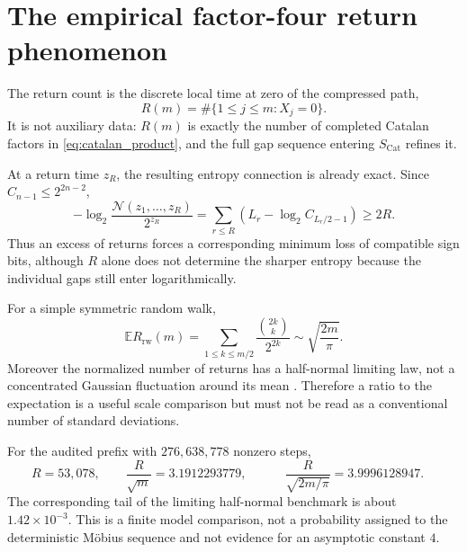 \documentclass[11pt]{amsart}
\numberwithin{equation}{section}
\theoremstyle{plain}
\theoremstyle{definition}
\theoremstyle{remark}
\newcommand{\Cat}{C}
\begin{document}
\section{The empirical factor-four return phenomenon}
\label{sec:factor_four_returns}

The return count is the discrete local time at zero of the compressed path,
\begin{equation}
 R(m)=\#\{1\leq j\leq m:X_j=0\}.
\label{eq:compressed_return_local_time}
\end{equation}
It is not auxiliary data: $R(m)$ is exactly the number of completed Catalan
factors in \eqref{eq:catalan_product}, and the full gap sequence entering
$S_{\mathrm{Cat}}$ refines it.

At a return time $z_R$, the resulting entropy connection is already exact.
Since $\Cat_{n-1}\leq2^{2n-2}$,
\begin{equation}
 -\log_2\frac{\mathcal N(z_1,\ldots,z_R)}{2^{z_R}}
 =\sum_{r\leq R}\left(L_r-\log_2\Cat_{L_r/2-1}\right)
 \geq2R.
\label{eq:return_entropy_lower_bound}
\end{equation}
Thus an excess of returns forces a corresponding minimum loss of compatible
sign bits, although $R$ alone does not determine the sharper entropy because
the individual gaps still enter logarithmically.

For a simple symmetric random walk,
\begin{equation}
 \mathbb E R_{\mathrm{rw}}(m)
 =\sum_{1\leq k\leq m/2}\frac{\binom{2k}{k}}{2^{2k}}
 \sim\sqrt{\frac{2m}{\pi}}.
\label{eq:iid_return_mean}
\end{equation}
Moreover the normalized number of returns has a half-normal limiting law,
not a concentrated Gaussian fluctuation around its mean
\cite{Dobler2015}.  Therefore a ratio to the expectation is a useful scale
comparison but must not be read as a conventional number of standard
deviations.

For the audited prefix with $276{,}638{,}778$ nonzero steps,
\begin{equation}
 R=53{,}078,\qquad
 \frac{R}{\sqrt m}=3.1912293779,\qquad
 \boxed{\quad
 \frac{R}{\sqrt{2m/\pi}}=3.9996128947.
 \quad}
\label{eq:observed_factor_four}
\end{equation}
The corresponding tail of the limiting half-normal benchmark is about
$1.42\times10^{-3}$.  This is a finite model comparison, not a probability
assigned to the deterministic M\"obius sequence and not evidence for an
asymptotic constant $4$.
\end{document}

